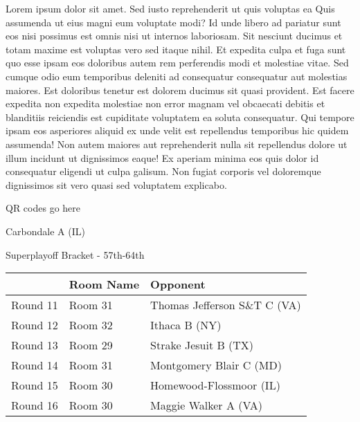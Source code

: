 \documentclass{article}%
\begin{document}
\vspace*{8pt}%
\linebreak%
\newline%
\newline%
    Lorem ipsum dolor sit amet. Sed iusto reprehenderit ut quis voluptas ea Quis assumenda ut eius magni eum voluptate modi? Id unde libero ad pariatur sunt eos nisi possimus est omnis nisi ut internos laboriosam. Sit nesciunt ducimus et totam maxime est voluptas vero sed itaque nihil. Et expedita culpa et fuga sunt quo esse ipsam eos doloribus autem rem perferendis modi et molestiae vitae.\newline%
\newline%
    Sed cumque odio eum temporibus deleniti ad consequatur consequatur aut molestias maiores. Est doloribus tenetur est dolorem ducimus sit quasi provident. Est facere expedita non expedita molestiae non error magnam vel obcaecati debitis et blanditiis reiciendis est cupiditate voluptatem ea soluta consequatur. Qui tempore ipsam eos asperiores aliquid ex unde velit est repellendus temporibus hic quidem assumenda!\newline%
\newline%
    Non autem maiores aut reprehenderit nulla sit repellendus dolore ut illum incidunt ut dignissimos eaque! Ex aperiam minima eos quis dolor id consequatur eligendi ut culpa galisum. Non fugiat corporis vel doloremque dignissimos sit vero quasi sed voluptatem explicabo.\newline%
\newline%
\vspace*{30pt}%
\begin{center}%
\begin{Huge}%
QR codes go here%
\end{Huge}%
\end{center}%
\newpage%
\begin{center}%
\begin{Huge}%
Carbondale A (IL)%
\end{Huge}%
\vspace*{8pt}%
\linebreak%
\begin{Large}%
Superplayoff Bracket {-} 57th{-}64th%
\end{Large}%
\end{center}%
%
\begin{tabularx}{\textwidth}{|c|Y|Y|}%
\hline%
&Room Name&Opponent\\%
\hline%
Round 11&Room 31&Thomas Jefferson S\&T C (VA)\\%
Round 12&Room 32&Ithaca B (NY)\\%
Round 13&Room 29&Strake Jesuit B (TX)\\%
Round 14&Room 31&Montgomery Blair C (MD)\\%
Round 15&Room 30&Homewood{-}Flossmoor (IL)\\%
Round 16&Room 30&Maggie Walker A (VA)\\%
\hline%
\end{tabularx}%
\end{document}
